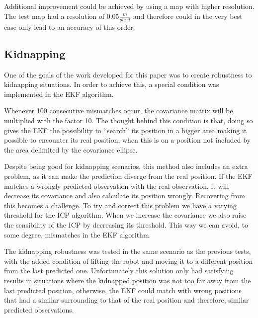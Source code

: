 Additional improvement could be achieved by using a map with higher resolution. The test map had a resolution of $0.05 \frac{m}{pixel}$ and therefore could in the very best case only lead to an accuracy of this order. 


\subsection{Kidnapping}
\label{subsec:Kidnapping}
One of the goals of the work developed for this paper was to create robustness to kidnapping situations. In order to achieve this, a special condition was implemented in the EKF algorithm. 

Whenever  100 consecutive mismatches occur, the covariance matrix will be multiplied with the factor 10. The thought behind this condition is that, doing so gives the EKF the possibility to ``search'' its position in a bigger area making it possible to encounter its real position, when this is on a position not included by the area delimited by the covariance ellipse. 

Despite being good for kidnapping scenarios, this method also includes an extra problem, as it can make the prediction diverge from the real position. If the EKF matches a wrongly predicted observation with the real observation, it will decrease its covariance and also calculate its position wrongly. Recovering from this becomes a challenge. To try and correct this problem we have a varying threshold for the ICP algorithm. When we increase the covariance we also raise the sensibility of the ICP by decreasing its threshold. This way we can avoid, to some degree, mismatches in the EKF algorithm. 

The kidnapping robustness was tested in the same scenario as the previous tests, with the added condition of lifting the robot and moving it to a different position from the last predicted one. Unfortunately this solution only had satisfying results in situations where the kidnapped position was not too far away from the last predicted position, otherwise, the EKF could match with wrong positions that had a similar surrounding to that of the real position and therefore, similar predicted observations.

